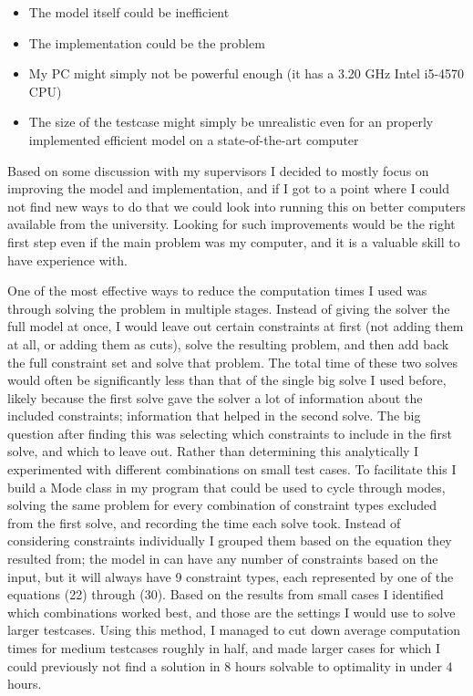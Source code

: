 \documentclass[a4paper,12pt]{article}
\begin{document}
\begin{itemize}
\item The model itself could be inefficient
\item The implementation could be the problem
\item My PC might simply not be powerful enough (it has a 3.20 GHz Intel i5-4570 CPU)
\item The size of the testcase might simply be unrealistic even for an properly implemented efficient model on a state-of-the-art computer
\end{itemize}

Based on some discussion with my supervisors I decided to mostly focus on improving the model and implementation, and if I got to a point where I could not find new ways to do that we could look into running this on better computers available from the university. Looking for such improvements would be the right first step even if the main problem was my computer, and it is a valuable skill to have experience with. 

One of the most effective ways to reduce the computation times I used was through solving the problem in multiple stages. Instead of giving the solver the full model at once, I would leave out certain constraints at first (not adding them at all, or adding them as cuts), solve the resulting problem, and then add back the full constraint set and solve that problem. The total time of these two solves would often be significantly less than that of the single big solve I used before, likely because the first solve gave the solver a lot of information about the included constraints; information that helped in the second solve. The big question after finding this was selecting which constraints to include in the first solve, and which to leave out. Rather than determining this analytically I experimented with different combinations on small test cases. To facilitate this I build a Mode class in my program that could be used to cycle through modes, solving the same problem for every combination of constraint types excluded from the first solve, and recording the time each solve took. Instead of considering constraints individually I grouped them based on the equation they resulted from; the model in  can have any number of constraints based on the input, but it will always have 9 constraint types, each represented by one of the equations (22) through (30). Based on the results from small cases I identified which combinations worked best, and those are the settings I would use to solve larger testcases. Using this method, I managed to cut down average computation times for medium testcases roughly in half, and made larger cases for which I could previously not find a solution in 8 hours solvable to optimality in under 4 hours. 
\end{document}
